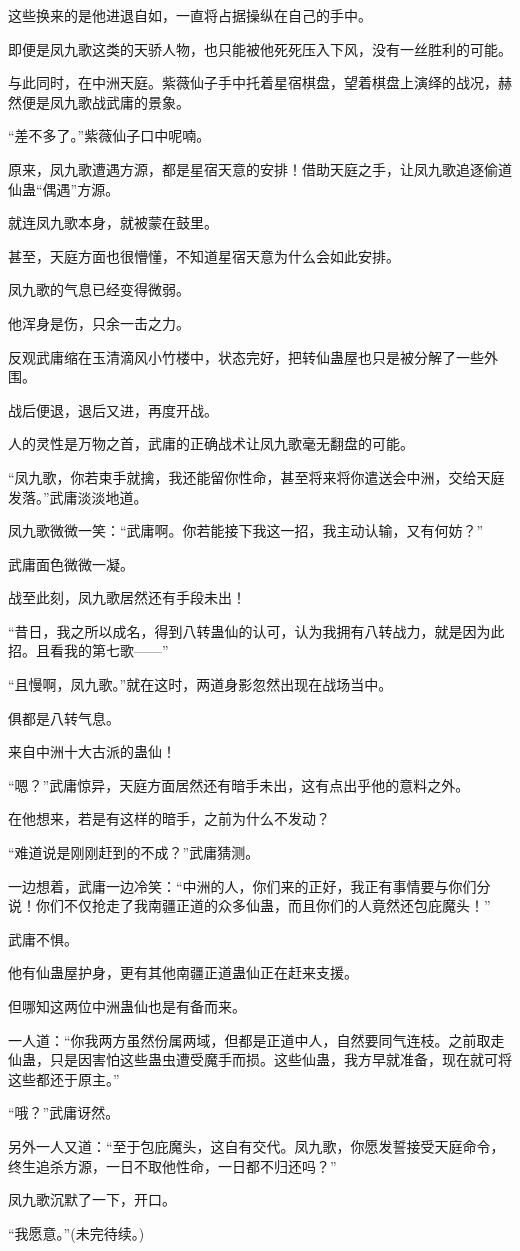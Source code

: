 \begin{this_body}
这些换来的是他进退自如，一直将占据操纵在自己的手中。

即便是凤九歌这类的天骄人物，也只能被他死死压入下风，没有一丝胜利的可能。

与此同时，在中洲天庭。紫薇仙子手中托着星宿棋盘，望着棋盘上演绎的战况，赫然便是凤九歌战武庸的景象。

“差不多了。”紫薇仙子口中呢喃。

原来，凤九歌遭遇方源，都是星宿天意的安排！借助天庭之手，让凤九歌追逐偷道仙蛊“偶遇”方源。

就连凤九歌本身，就被蒙在鼓里。

甚至，天庭方面也很懵懂，不知道星宿天意为什么会如此安排。

凤九歌的气息已经变得微弱。

他浑身是伤，只余一击之力。

反观武庸缩在玉清滴风小竹楼中，状态完好，把转仙蛊屋也只是被分解了一些外围。

战后便退，退后又进，再度开战。

人的灵性是万物之首，武庸的正确战术让凤九歌毫无翻盘的可能。

“凤九歌，你若束手就擒，我还能留你性命，甚至将来将你遣送会中洲，交给天庭发落。”武庸淡淡地道。

凤九歌微微一笑：“武庸啊。你若能接下我这一招，我主动认输，又有何妨？”

武庸面色微微一凝。

战至此刻，凤九歌居然还有手段未出！

“昔日，我之所以成名，得到八转蛊仙的认可，认为我拥有八转战力，就是因为此招。且看我的第七歌——”

“且慢啊，凤九歌。”就在这时，两道身影忽然出现在战场当中。

俱都是八转气息。

来自中洲十大古派的蛊仙！

“嗯？”武庸惊异，天庭方面居然还有暗手未出，这有点出乎他的意料之外。

在他想来，若是有这样的暗手，之前为什么不发动？

“难道说是刚刚赶到的不成？”武庸猜测。

一边想着，武庸一边冷笑：“中洲的人，你们来的正好，我正有事情要与你们分说！你们不仅抢走了我南疆正道的众多仙蛊，而且你们的人竟然还包庇魔头！”

武庸不惧。

他有仙蛊屋护身，更有其他南疆正道蛊仙正在赶来支援。

但哪知这两位中洲蛊仙也是有备而来。

一人道：“你我两方虽然份属两域，但都是正道中人，自然要同气连枝。之前取走仙蛊，只是因害怕这些蛊虫遭受魔手而损。这些仙蛊，我方早就准备，现在就可将这些都还于原主。”

“哦？”武庸讶然。

另外一人又道：“至于包庇魔头，这自有交代。凤九歌，你愿发誓接受天庭命令，终生追杀方源，一日不取他性命，一日都不归还吗？”

凤九歌沉默了一下，开口。

“我愿意。”(未完待续。)

\end{this_body}


